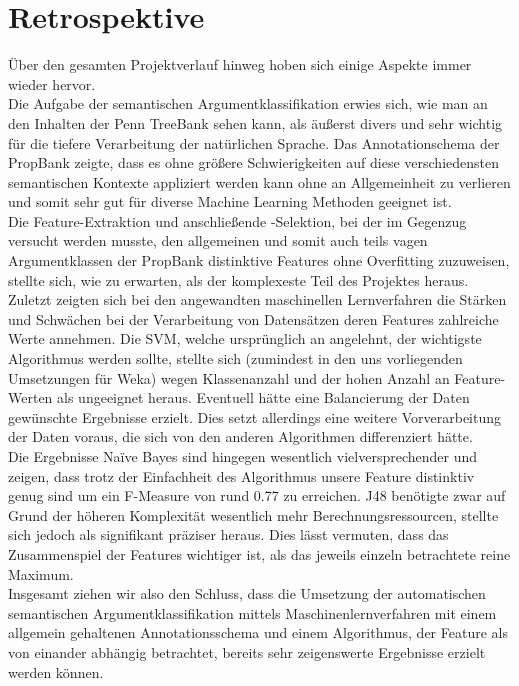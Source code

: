 \documentclass[]{article}
\begin{document}
\section{Retrospektive}
Über den gesamten Projektverlauf hinweg hoben sich einige Aspekte immer wieder hervor.\\
Die Aufgabe der semantischen Argumentklassifikation erwies sich, wie man an den Inhalten der Penn TreeBank sehen kann, als äußerst divers und sehr wichtig für die tiefere Verarbeitung der natürlichen Sprache. Das Annotationschema der PropBank zeigte, dass es ohne größere Schwierigkeiten auf diese verschiedensten semantischen Kontexte appliziert werden kann ohne an Allgemeinheit zu verlieren und somit sehr gut für diverse Machine Learning Methoden geeignet ist.\\
Die Feature-Extraktion und anschließende -Selektion, bei der im Gegenzug versucht werden musste, den allgemeinen und somit auch teils vagen Argumentklassen der PropBank distinktive Features ohne Overfitting zuzuweisen, stellte sich, wie zu erwarten, als der komplexeste Teil des Projektes heraus.\\
Zuletzt zeigten sich bei den angewandten maschinellen Lernverfahren die Stärken und Schwächen bei der Verarbeitung von Datensätzen deren Features zahlreiche Werte annehmen. Die SVM, welche ursprünglich an \cite{Pradhan05supportvector} angelehnt, der wichtigste Algorithmus werden sollte, stellte sich (zumindest in den uns vorliegenden Umsetzungen für Weka) wegen Klassenanzahl und der hohen Anzahl an Feature-Werten als ungeeignet heraus. Eventuell hätte eine Balancierung der Daten gewünschte Ergebnisse erzielt. Dies setzt allerdings eine weitere Vorverarbeitung der Daten voraus, die sich von den anderen Algorithmen differenziert hätte.\\
Die Ergebnisse Naïve Bayes sind hingegen wesentlich vielversprechender und zeigen, dass trotz der Einfachheit des Algorithmus unsere Feature distinktiv genug sind um ein F-Measure von rund 0.77 zu erreichen. J48 benötigte zwar auf Grund der höheren Komplexität wesentlich mehr Berechnungsressourcen, stellte sich jedoch als signifikant präziser heraus. Dies lässt vermuten, dass das Zusammenspiel der Features wichtiger ist, als das jeweils einzeln betrachtete reine Maximum.\\
Insgesamt ziehen wir also den Schluss, dass die Umsetzung der automatischen semantischen Argumentklassifikation mittels Maschinenlernverfahren mit einem allgemein gehaltenen Annotationsschema und einem Algorithmus, der Feature als von einander abhängig betrachtet, bereits sehr zeigenswerte Ergebnisse erzielt werden können.





\end{document}
